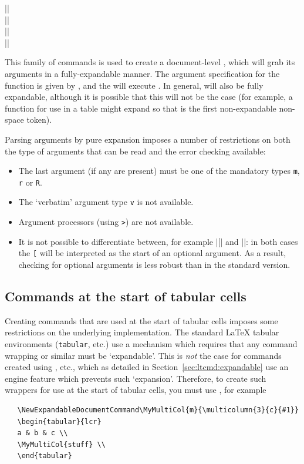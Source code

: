 \documentclass{ltxguide}
\begin{document}
\begin{decl}
  |\NewExpandableDocumentCommand|        \\
  |\RenewExpandableDocumentCommand|      \\
  |\ProvideExpandableDocumentCommand|    \\
  |\DeclareExpandableDocumentCommand|   
\end{decl}
This family of commands is used to create a document-level ,
which will grab its arguments in a fully-expandable manner. The
argument specification for the function is given by ,
and the  will execute . In  general,  will
also be fully expandable, although it is possible that this will
not be the case (for example, a function for use in a table might
expand so that  is the first non-expandable non-space token).

Parsing arguments by pure expansion imposes a number of restrictions on
both the type of arguments that can be read and the error checking
available:
\begin{itemize}
  \item The last argument (if any are present) must be one of the
    mandatory types \texttt{m}, \texttt{r} or \texttt{R}.
  \item The `verbatim' argument type \texttt{v} is not available.
  \item Argument processors (using \texttt{>}) are not available.
  \item It is not possible to differentiate between, for example
    |\foo[| and |\foo{[}|: in both cases the \texttt{[} will be
    interpreted as the start of an optional argument. As a
    result, checking for optional arguments is less robust than
    in the standard version.
\end{itemize}

\subsection{Commands at the start of tabular cells}

Creating commands that are used at the start of tabular cells imposes
some restrictions on the underlying implementation. The standard \LaTeX{}
tabular environments (\texttt{tabular}, etc.)  use a mechanism which requires
that any command wrapping  or similar must be
`expandable'. This is \emph{not} the case for commands created using
, etc., which as detailed in
Section~\ref{sec:ltcmd:expandable} use an engine feature which prevents
such `expansion'. Therefore, to create such wrappers for use at the start
of tabular cells, you must use , for example
\begin{verbatim}
   \NewExpandableDocumentCommand\MyMultiCol{m}{\multicolumn{3}{c}{#1}}
   \begin{tabular}{lcr}
   a & b & c \\
   \MyMultiCol{stuff} \\
   \end{tabular}
\end{verbatim}
\end{document}

